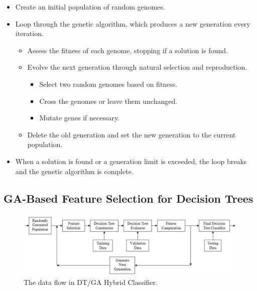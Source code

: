 \documentclass[conference]{IEEEtran}
\begin{document}
\begin{itemize}
\item{Create an initial population of random genomes.}
\item{Loop through the genetic algorithm, which produces a new generation every iteration.}

\begin{itemize}
\item{Assess the fitness of each genome, stopping if a solution is found.}
\item{Evolve the next generation through natural selection and reproduction.}

\begin{itemize}
\item{Select two random genomes based on fitness.}
\item{Cross the genomes or leave them unchanged.}
\item{Mutate genes if necessary.}
\end{itemize}
             
\item{Delete the old generation and set the new generation to the current population.}
\end{itemize}
            
\item{When a solution is found or a generation limit is exceeded, the loop breaks and the genetic algorithm is complete.}

\end{itemize} 

\subsection{GA-Based Feature Selection for Decision Trees}
\begin{figure}[h!]
  
  \centering
    \includegraphics[scale=0.25]{dfd.png}
\caption{The data flow in DT/GA Hybrid Classifier.}
\end{figure}
\end{document}
